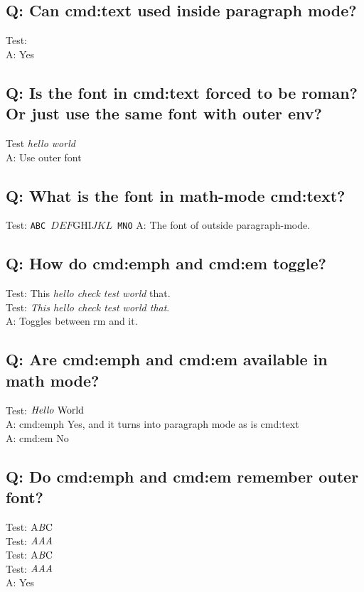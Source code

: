 \documentclass[11pt]{revtex4-1}
\begin{document}
\subsection*{Q: Can cmd:text used inside paragraph mode?}
Test:  \\
A: Yes

\subsection*{Q: Is the font in cmd:text forced to be roman? Or just use the same font with outer env?}
Test \textit{hello  world} \\
A: Use outer font

\subsection*{Q: What is the font in math-mode cmd:text?}
Test: \texttt{ABC $DEF \text{GHI} JKL$ MNO}
A: The font of outside paragraph-mode.

\subsection*{Q: How do cmd:emph and cmd:em toggle?}
Test: This {\em hello {\em check test} world} that. \\
Test: {\it This {\em hello {\em check test} world} that}. \\
A: Toggles between rm and it.

\subsection*{Q: Are cmd:emph and cmd:em available in math mode?}
Test: $\emph{Hello \emph{World}}$ \\
A: cmd:emph Yes, and it turns into paragraph mode as is cmd:text \\
A: cmd:em No

\subsection*{Q: Do cmd:emph and cmd:em remember outer font?}
Test: $\text{A\emph{B}C}$ \\
Test: $\emph{AAA}$ \\
Test: {\it $\text{A\emph{B}C}$ } \\
Test: {\it $\emph{AAA}$} \\
A: Yes
\end{document}
